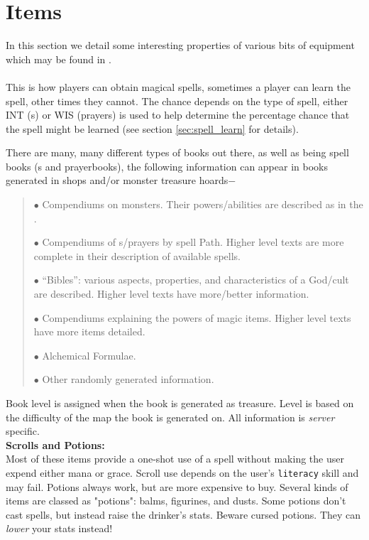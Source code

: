 \section{Items}
\label{sec:items}

In this section we detail some interesting properties of various 
bits of equipment which may be found in \cf . \\ 

 \\ 
This is how players can obtain magical spells, sometimes a player can
learn the spell, other times they cannot. The chance depends on the type
of spell, either INT (\incantation s) or WIS (prayers) is used to help
determine the percentage chance that the spell might be learned (see section
\ref{sec:spell_learn} for details).

There are many, many different types of books out there,
as well as being spell books (\wizbook s and prayerbooks), the 
following information can 
appear in books generated in shops and/or monster treasure hoards$-$ 
\begin{quote}
        $\bullet$ Compendiums on monsters. Their powers/abilities are
            described as in the \spoiler . 

        $\bullet$ Compendiums of \incantation s/prayers by spell Path. Higher
            level texts are more complete in their description of
            available spells.

        $\bullet$ ``Bibles'': various aspects, properties, and characteristics
            of a God/cult are described. Higher level texts
            have more/better information. 

        $\bullet$ Compendiums explaining the powers of magic items. Higher
            level texts have more items detailed. 

        $\bullet$ Alchemical Formulae. 

        $\bullet$ Other randomly generated information.
\end{quote}
Book level is assigned when the book is generated as treasure.
Level is based on the difficulty of the map the book is
generated on. All information is {\em server} specific. \\ 

{\bf Scrolls and Potions:}
\\ 

	Most of these items provide a one-shot use of a spell without
	making the user expend either mana or grace. Scroll use
	depends on the user's {\tt literacy} skill and may fail. Potions 
	always work, but are more expensive to buy. Several kinds
	of items are classed as "potions": balms, figurines, and
	dusts. Some potions don't cast spells, but instead raise
	the drinker's stats. Beware cursed potions. They can {\em lower}
	your stats instead! \\ 

